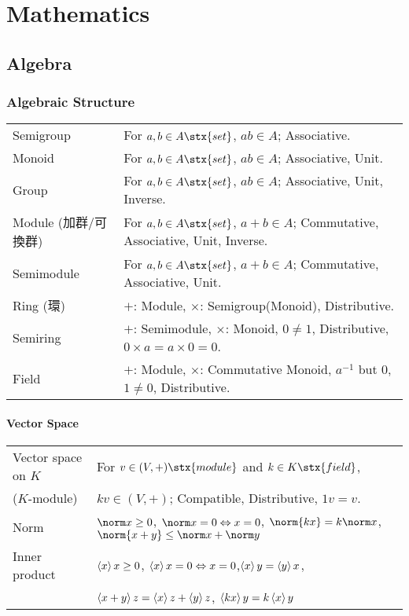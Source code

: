 
\newcommand{\Hom}{\mathop{\mathrm{Hom}}}
\section{Mathematics}
\subsection{Algebra}
\subsubsection{Algebraic Structure}
\begin{tabular}{l@{ :\ \ \ }l}
Semigroup     & For $a,b\in A\stx{set}$, $ab\in A$; Associative.\\
Monoid        & For $a,b\in A\stx{set}$, $ab\in A$; Associative, Unit.\\
Group         & For $a,b\in A\stx{set}$, $ab\in A$; Associative, Unit, Inverse.\\
Module {\tiny (加群/可換群)}
              & For $a,b\in A\stx{set}$, $a+b\in A$; Commutative, Associative, Unit, Inverse.\\
Semimodule    & For $a,b\in A\stx{set}$, $a+b\in A$; Commutative, Associative, Unit.\\
Ring   {\tiny (環)}
              & $+$: Module, $\times$: Semigroup{\footnotesize (Monoid)}, Distributive.\\
Semiring      & $+$: Semimodule, $\times$: Monoid, $0\neq1$, Distributive, $0\times a = a\times 0 = 0$.\\
Field         & $+$: Module, $\times$: Commutative Monoid, $a^{-1}$ but $0$, $1\neq0$, Distributive.
\end{tabular}

\vspace{.5zw}

\paragraph{Vector Space}\mbox{}\par
\begin{tabular}{l@{ :\ \ \ }l}
Vector space on $K$  & For $v\in(V,+)\stx{module}$ and $k\in K\stx{field}$,\\
\hfill ($K$-module)  & \qquad $k v\in (V,+)$; Compatible, Distributive, $1v=v$.\\
Norm &
    $\norm x\ge0$, $\norm x=0\Leftrightarrow x=0$, $\norm{kx}=k\norm x$,
    $\norm{x+y}\le \norm x+\norm y$\\
Inner product & $\braket xx\ge0$, $\braket xx=0\Leftrightarrow x=0$,$\braket{x}{y}=\braket{y}{x}$,\\
              & \qquad $\braket{x+y}z=\braket xz + \braket yz$, $\braket{kx}y =k\braket xy$

\end{tabular}

